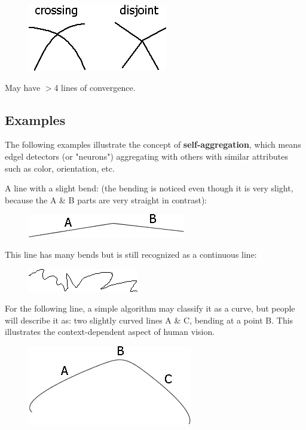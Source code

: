 \begin{figure}[H]
\centering
\includegraphics[scale=0.7]{Junctions-X.PNG}
\end{figure}

May have $>$4 lines of convergence.

\subsection{Examples}

The following examples illustrate the concept of \textbf{self-aggregation}, which means edgel detectors (or "neurons") aggregating with others with similar attributes such as color, orientation, etc.

A line with a slight bend: (the bending is noticed even though it is very slight, because the A \& B parts are very straight in contrast):

\begin{figure}[H]
\centering
\includegraphics[scale=0.7]{Line1.PNG}
\end{figure}

This line has many bends but is still recognized as a continuous line: 

\begin{figure}[H]
\centering
\includegraphics[scale=0.7]{Line2.PNG}
\end{figure}

For the following line, a simple algorithm may classify it as a curve, but people will describe it as: two slightly curved lines A \& C, bending at a point B. This illustrates the context-dependent aspect of human vision.

\begin{figure}[H]
\centering
\includegraphics[scale=0.7]{Line3.PNG}
\end{figure}

